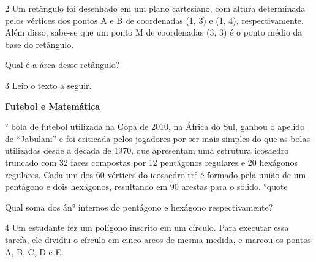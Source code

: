 \begin{escolha}
{{{\begin{escolha}
{{{{{\begin{escolha}
\begin{escolha}
{

\num{2} Um retângulo foi desenhado em um plano cartesiano, com altura
determinada pelos vértices dos pontos A e B de coordenadas (1, 3) e (1,
4), respectivamente. Além disso, sabe-se que um ponto M de
coordenadas (3, 3) é o ponto médio da base do retângulo.

Qual é a área desse retângulo?



\num{3} Leio o texto a seguir.

\begin{q°}
\textbf{Futebol e Matemática}

° bola de futebol utilizada na Copa de 2010, na África do Sul, ganhou o
apelido de ``Jabulani'' e foi criticada pelos jogadores por ser mais
simples do que as bolas utilizadas desde a década de 1970, que
apresentam uma estrutura icosaedro truncado com 32 faces compostas por
12 pentágonos regulares e 20 hexágonos regulares. Cada um dos 60
vértices do icosaedro tr° é formado pela união de um pentágono e
dois hexágonos, resultando em 90 arestas para o sólido.
\e°{quote}

Qual soma dos ân° internos do pentágono e hexágono respectivamente?



\num{4} Um estudante fez um polígono inscrito em um círculo. Para executar
essa tarefa, ele dividiu o círculo em cinco arcos de mesma medida, e
marcou os pontos A, B, C, D e E.


\end{q°}}
\end{escolha}
\end{escolha}}}}}}
\end{escolha}}}}
\end{escolha}
